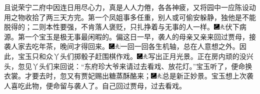 且说荣宁二府中因连日用尽心力，真是人人力倦，各各神疲，又将园中一应陈设动用之物收拾了两三天方完。第一个凤姐事多任重，别人或可偷安躲静，独他是不能脱得的；二则本性要强，不肯落人褒贬，只扎挣着与无事的人一样。{\includegraphics[width=3mm]{../Images/00003}\includegraphics[width=3mm]{../Images/00012}\footnotesize \kaishu 伏下病源。}第一个宝玉是极无事最闲暇的。偏这日一早，袭人的母亲又亲来回过贾母，接袭人家去吃年茶，晚间才得回来。{\includegraphics[width=3mm]{../Images/00003}\includegraphics[width=3mm]{../Images/00012}\footnotesize \kaishu 一回一回各生机轴，总在人意想之外。}因此，宝玉只和众丫头们掷骰子赶围棋作戏。{\includegraphics[width=3mm]{../Images/00003}\includegraphics[width=3mm]{../Images/00012}\footnotesize \kaishu 写出正月光景。}正在房内顽的没兴头，忽见丫头们来回说：“东府珍大爷来请过去看戏、放花灯。”宝玉听了，便命换衣裳。才要去时，忽又有贾妃赐出糖蒸酥酪来；{\includegraphics[width=3mm]{../Images/00003}\includegraphics[width=3mm]{../Images/00012}\footnotesize \kaishu 总是新正妙景。}宝玉想上次袭人喜吃此物，便命留与袭人了。自己回过贾母，过去看戏。

